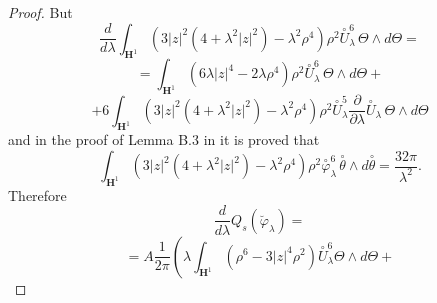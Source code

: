 \documentclass[a4paper,12pt]{amsart}
\renewcommand{\phi}{\varphi}
\newcommand{\de}{\partial}
\renewcommand{\H}{\mathbf{H}}
\renewcommand{\l}{\lambda }
\newcommand{\var}{\varphi }
\begin{document}
\begin{proof}
 But
 $$ \frac{d}{d\lambda}\int_{\H^1} \left( 3 |z|^2 (4 + \l^2 |z|^2) - \l^2 \rho^4 \right) \rho^2 \overset{\circ}{U}_\l^6 \, \Theta\wedge d\Theta = $$
 $$=\int_{\H^1} \left( 6\l |z|^4 - 2\l \rho^4 \right) \rho^2 \overset{\circ}{U}_\l^6 \, \Theta\wedge d\Theta + $$
 $$ +6\int_{\H^1} \left( 3 |z|^2 (4 + \l^2 |z|^2) - \l^2 \rho^4 \right) \rho^2 \overset{\circ}{U}_\l^5\frac{\de}{\de\lambda}\overset{\circ}{U}_{\lambda} \, \Theta\wedge d\Theta $$
 and in the proof of Lemma B.3 in \cite{CMY2} it is proved that
 $$\int_{\H^1} \left( 3 |z|^2 (4 + \l^2 |z|^2) - \l^2 \rho^4 \right) \rho^2 \overset{\circ}{\var}_\l^6 \, \overset{\circ}{\theta} \wedge d \overset{\circ}{\theta} = \frac{32\pi}{\lambda^2}.$$
 Therefore
 $$\frac{d}{d\lambda}Q_s(\breve{\var}_\l) = $$
 $$= A\frac{1}{2\pi}\left( \l \int_{\H^1} \left(\rho^6 -3|z|^4 \rho^2\right)\overset{\circ}{U}_\l^6 \Theta\wedge d\Theta + \right.$$

\end{proof}
\end{document}
